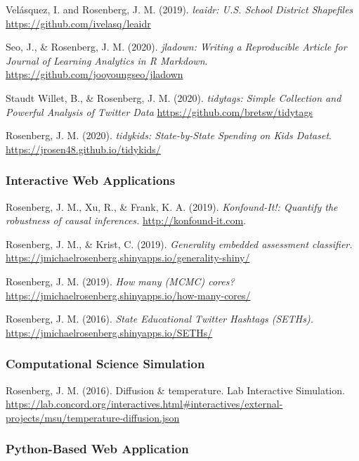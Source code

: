 \documentclass[
  14,
]{article}
\begin{document}
Velásquez, I. and Rosenberg, J. M. (2019). \emph{leaidr: U.S. School
District Shapefiles} \url{https://github.com/ivelasq/leaidr}

Seo, J., \& Rosenberg, J. M. (2020). \emph{jladown: Writing a
Reproducible Article for Journal of Learning Analytics in R Markdown}.
\url{https://github.com/jooyoungseo/jladown}

Staudt Willet, B., \& Rosenberg, J. M. (2020). \emph{tidytags: Simple
Collection and Powerful Analysis of Twitter Data}
\url{https://github.com/bretsw/tidytags}

Rosenberg, J. M. (2020). \emph{tidykids: State-by-State Spending on Kids
Dataset}. \url{https://jrosen48.github.io/tidykids/}

\hypertarget{interactive-web-applications}{%
\subsubsection{Interactive Web
Applications}\label{interactive-web-applications}}

Rosenberg, J. M., Xu, R., \& Frank, K. A. (2019). \emph{Konfound-It!:
Quantify the robustness of causal inferences.}
\url{http://konfound-it.com}.

Rosenberg, J. M., \& Krist, C. (2019). \emph{Generality embedded
assessment classifier.}
\url{https://jmichaelrosenberg.shinyapps.io/generality-shiny/}

Rosenberg, J. M. (2019). \emph{How many (MCMC) cores?}
\url{https://jmichaelrosenberg.shinyapps.io/how-many-cores/}

Rosenberg, J. M. (2016). \emph{State Educational Twitter Hashtags
(SETHs).} \url{https://jmichaelrosenberg.shinyapps.io/SETHs/}

\hypertarget{computational-science-simulation}{%
\subsubsection{Computational Science
Simulation}\label{computational-science-simulation}}

Rosenberg, J. M. (2016). Diffusion \& temperature. Lab Interactive
Simulation.
\url{https://lab.concord.org/interactives.html\#interactives/external-projects/msu/temperature-diffusion.json}

\hypertarget{python-based-web-application}{%
\subsubsection{Python-Based Web
Application}\label{python-based-web-application}}
\end{document}
